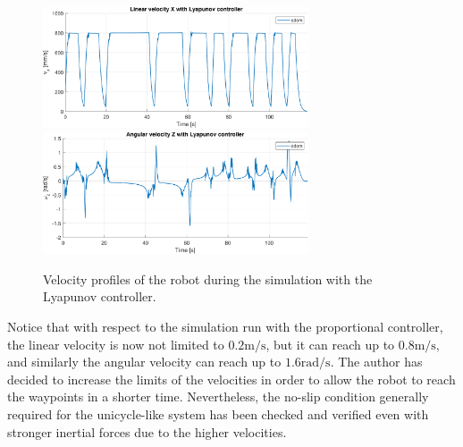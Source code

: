 \begin{figure}[H]
    \centering
    \includegraphics[width=0.7\textwidth]{./img/MATLAB/linear_velocity_lyapunov.pdf}
    \includegraphics[width=0.7\textwidth]{./img/MATLAB/angular_velocity_lyapunov.pdf}
    \caption{Velocity profiles of the robot during the simulation with the Lyapunov controller.}
    \label{fig:lyapunov_controller_velocity_profiles}
\end{figure}

Notice that with respect to the simulation run with the proportional controller, the linear velocity is now not limited to $0.2 \text{m/s}$, but it can reach up to $0.8 \text{m/s}$, and similarly the angular velocity can reach up to $1.6 \text{rad/s}$.
The author has decided to increase the limits of the velocities in order to allow the robot to reach the waypoints in a shorter time.
Nevertheless, the no-slip condition generally required for the unicycle-like system has been checked and verified even with stronger inertial forces due to the higher velocities.
